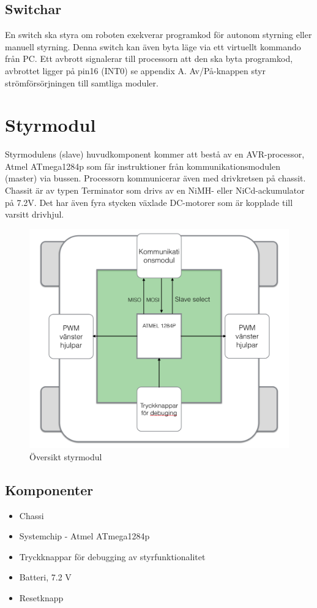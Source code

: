 \documentclass[a4paper,12pt,fleqn]{article}
\begin{document}
\subsection{Switchar}
En switch ska styra om roboten exekverar programkod för autonom styrning eller manuell styrning. Denna switch kan även byta läge via ett virtuellt kommando från PC. Ett avbrott signalerar till processorn att den ska byta programkod, avbrottet ligger på pin16 (INT0) se appendix A. 
Av/På-knappen styr strömförsörjningen till samtliga moduler. 


\newpage
\section{Styrmodul}
Styrmodulens (slave) huvudkomponent kommer att bestå av en AVR-processor, Atmel ATmega1284p som får instruktioner från kommunikationsmodulen (master) via bussen. Processorn kommunicerar även med drivkretsen på chassit. Chassit är av typen Terminator som drivs av en NiMH- eller NiCd-ackumulator på 7.2V. Det har även fyra stycken växlade DC-motorer som är kopplade till varsitt drivhjul. 

\begin{figure}[htp] %
  \begin{center}
  \includegraphics[keepaspectratio=true,width=0.5\linewidth]{bilder/styrmodul}  %
  \end{center}
  \caption{Översikt styrmodul} %
  \label{fig:styr} %
\end{figure}
\newpage


\subsection{Komponenter}
\begin{itemize}
	\item Chassi
	\item Systemchip - Atmel ATmega1284p
	\item Tryckknappar för debugging av styrfunktionalitet
	\item Batteri, 7.2 V
	\item Resetknapp
\end{itemize}
\end{document}
